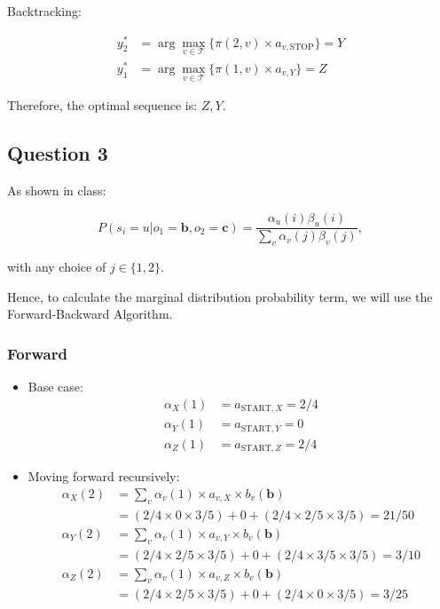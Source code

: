 \documentclass[11pt,fancychapters]{article}
\begin{document}
Backtracking:

\begin{align*}
	y_2^* &= \arg \max_{v \in \mathcal{T}} \{ \pi(2, v) \times a_{v, \text{STOP}} \} = Y \\
	y_1^* &= \arg \max_{v \in \mathcal{T}} \{ \pi(1, v) \times a_{v, Y} \} = Z
\end{align*}

Therefore, the optimal sequence is: $Z, Y$.

\subsection*{Question 3}

As shown in class:

\begin{equation*}
	P(s_i = u | o_1 = \textbf{b}, o_2 = \textbf{c}) = \frac{\alpha_u(i) \beta_u(i)}{\sum_{v} \alpha_v(j) \beta_v(j)},
\end{equation*}

with any choice of $j \in \{1, 2\}$.

Hence, to calculate the marginal distribution probability term, we will use the Forward-Backward Algorithm.

\subsubsection*{Forward}

\begin{itemize}
	\item Base case:
	\begin{align*}
		\alpha_X(1) &= a_{\text{START}, X} = 2/4 \\
		\alpha_Y(1) &= a_{\text{START}, Y} = 0 \\
		\alpha_Z(1) &= a_{\text{START}, Z} = 2/4
	\end{align*}
	
	\item Moving forward recursively:
	\begin{align*}
		\alpha_X(2) &= \sum_v \alpha_v(1) \times a_{v, X} \times b_v(\textbf{b}) \\
		&= (2/4 \times 0 \times 3/5) + 0 + (2/4 \times 2/5 \times 3/5) = 21/50 \\
		\alpha_Y(2) &= \sum_v \alpha_v(1) \times a_{v, Y} \times b_v(\textbf{b}) \\
		& = (2/4 \times 2/5 \times 3/5) + 0 + (2/4 \times 3/5 \times 3/5) = 3/10 \\
		\alpha_Z(2) &= \sum_v \alpha_v(1) \times a_{v, Z} \times b_v(\textbf{b}) \\
		& = (2/4 \times 2/5 \times 3/5) + 0 + (2/4 \times 0 \times 3/5) = 3/25
	\end{align*}
\end{itemize}
\end{document}
